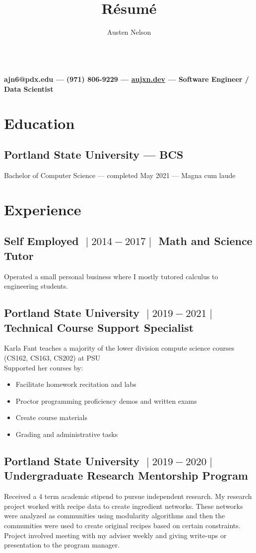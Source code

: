 \documentclass{article}
\title{R\'esum\'e}
\author{Austen Nelson}
\makeatletter
\renewcommand{\maketitle}
{
\begin{center}
\huge \bfseries \theauthor\\
\vspace{.25em}
   \mdseries \normalsize ajn6@pdx.edu --- (971) 806-9229 --- \href{aujxn.dev}{aujxn.dev} --- Software Engineer / Data Scientist
\end{center}
}
\makeatother
\begin{document}
\maketitle

\section{Education}

\subsection{Portland State University --- BCS}
Bachelor of Computer Science --- completed May 2021 --- Magna cum laude

\section{Experience}

\subsection{Self Employed $\;\vert\;2014-2017\;\vert\;$ Math and Science Tutor}
Operated a small personal business where I mostly tutored calculus to
engineering students.

\subsection{Portland State University $\;\vert\;2019-2021\;\vert\;$ Technical Course Support Specialist}
Karla Fant teaches a majority of the lower division compute science courses (CS162, CS163, CS202) at PSU\\
Supported her courses by:

\begin{itemize}
\item Facilitate homework recitation and labs
\item Proctor programming proficiency demos and written exams
\item Create course materials
\item Grading and administrative tasks
\end{itemize}

\subsection{Portland State University $\;\vert\;2019-2020\;\vert\;$ Undergraduate Research Mentorship Program}
Received a 4 term academic stipend to pursue independent research. My research project worked with recipe data
to create ingredient networks. These networks were analyzed as communities using modularity algorithms and then
the communities were used to create original recipes based on certain constraints. Project involved meeting with
my adviser weekly and giving write-ups or presentation to the program manager.
\end{document}
